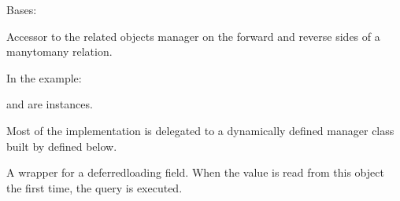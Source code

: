 \documentclass[letterpaper,10pt,english]{sphinxmanual}
\begin{document}
\begin{fulllineitems}
\begin{fulllineitems}
\end{fulllineitems}


\begin{fulllineitems}
\label{\detokenize{users:users.models.courses.MultipleObjectsReturned}}
\sphinxAtStartPar
Bases: 

\end{fulllineitems}


\begin{fulllineitems}
\label{\detokenize{users:users.models.courses.assignments}}
\sphinxAtStartPar
Accessor to the related objects manager on the forward and reverse sides of
a many\sphinxhyphen{}to\sphinxhyphen{}many relation.

\sphinxAtStartPar
In the example:

\begin{sphinxVerbatim}[commandchars=\\\{\}]
 
       
\end{sphinxVerbatim}

\sphinxAtStartPar
{} and  are 
instances.

\sphinxAtStartPar
Most of the implementation is delegated to a dynamically defined manager
class built by  defined below.

\end{fulllineitems}


\begin{fulllineitems}
\label{\detokenize{users:users.models.courses.code}}
\sphinxAtStartPar
A wrapper for a deferred\sphinxhyphen{}loading field. When the value is read from this
object the first time, the query is executed.


\end{fulllineitems}
\end{fulllineitems}
\end{document}
